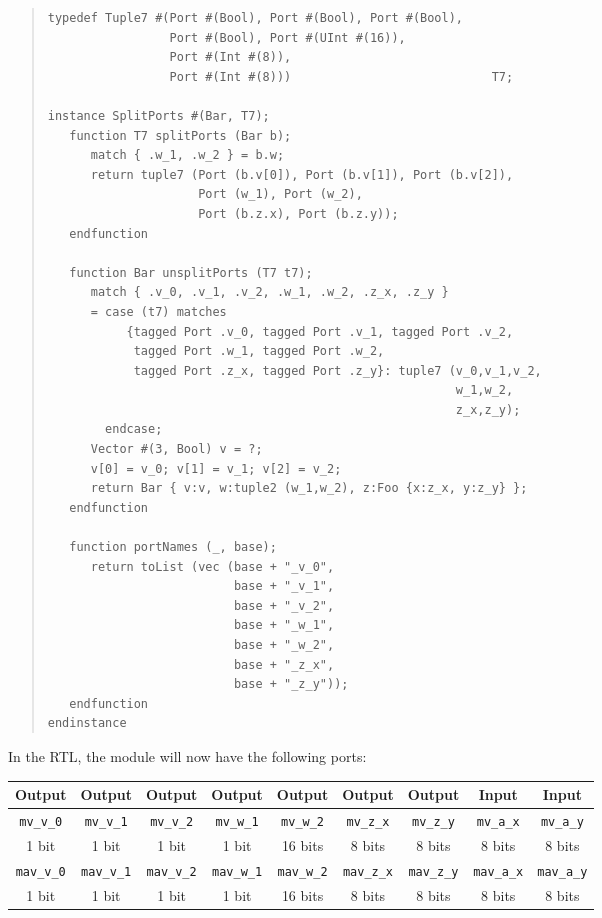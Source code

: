 \begin{quote}
\begin{verbatim}
typedef Tuple7 #(Port #(Bool), Port #(Bool), Port #(Bool),
                 Port #(Bool), Port #(UInt #(16)),
                 Port #(Int #(8)),
                 Port #(Int #(8)))                            T7;

instance SplitPorts #(Bar, T7);
   function T7 splitPorts (Bar b);
      match { .w_1, .w_2 } = b.w;
      return tuple7 (Port (b.v[0]), Port (b.v[1]), Port (b.v[2]),
                     Port (w_1), Port (w_2),
                     Port (b.z.x), Port (b.z.y));
   endfunction

   function Bar unsplitPorts (T7 t7);
      match { .v_0, .v_1, .v_2, .w_1, .w_2, .z_x, .z_y }
      = case (t7) matches
           {tagged Port .v_0, tagged Port .v_1, tagged Port .v_2,
            tagged Port .w_1, tagged Port .w_2,
            tagged Port .z_x, tagged Port .z_y}: tuple7 (v_0,v_1,v_2,
                                                         w_1,w_2,
                                                         z_x,z_y);
        endcase;
      Vector #(3, Bool) v = ?;
      v[0] = v_0; v[1] = v_1; v[2] = v_2;
      return Bar { v:v, w:tuple2 (w_1,w_2), z:Foo {x:z_x, y:z_y} };
   endfunction

   function portNames (_, base);
      return toList (vec (base + "_v_0",
                          base + "_v_1",
                          base + "_v_2",
                          base + "_w_1",
                          base + "_w_2",
                          base + "_z_x",
                          base + "_z_y"));
   endfunction
endinstance
\end{verbatim}
\end{quote}

In the RTL, the module will now have the following ports:

\begin{tabular}{|c|c|c|c|c|c|c||c|c|}
    \hline
     Output &
     Output &
     Output &
     Output &
     Output &
     Output &
     Output &
     Input  &
     Input  \\
    \hline
     {\tt mv\_v\_0}  &
     {\tt mv\_v\_1}  &
     {\tt mv\_v\_2}  &
     {\tt mv\_w\_1}  &
     {\tt mv\_w\_2}  &
     {\tt mv\_z\_x}  &
     {\tt mv\_z\_y}  &
     {\tt mv\_a\_x}  &
     {\tt mv\_a\_y} \\
      1 bit  &
      1 bit  &
      1 bit  &
      1 bit  &
     16 bits &
      8 bits &
      8 bits &
      8 bits &
      8 bits \\
    \hline
     {\tt mav\_v\_0}  &
     {\tt mav\_v\_1}  &
     {\tt mav\_v\_2}  &
     {\tt mav\_w\_1}  &
     {\tt mav\_w\_2}  &
     {\tt mav\_z\_x}  &
     {\tt mav\_z\_y}  &
     {\tt mav\_a\_x}  &
     {\tt mav\_a\_y} \\
      1 bit  &
      1 bit  &
      1 bit  &
      1 bit  &
     16 bits &
      8 bits &
      8 bits &
      8 bits &
      8 bits \\
    \hline
\end{tabular}


